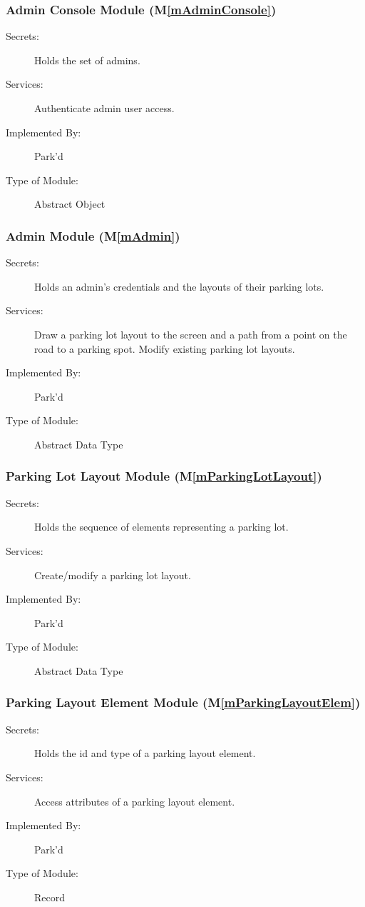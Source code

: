 \documentclass[12pt, titlepage]{article}
\newcommand{\mref}[1]{M\ref{#1}}
\begin{document}
\color{black}

\subsubsection{Admin Console Module (\mref{mAdminConsole})}
\begin{description}
\item[Secrets:] Holds the set of admins.
\item[Services:] Authenticate admin user access.
\item[Implemented By:] Park'd
\item[Type of Module:] Abstract Object
\end{description}

\subsubsection{Admin Module (\mref{mAdmin})}
\begin{description}
\item[Secrets:] Holds an admin's credentials and the layouts of their parking
lots.
\item[Services:] Draw a parking lot layout to the screen and a path from a point
on the road to a parking spot. Modify existing parking lot layouts.
\item[Implemented By:] Park'd
\item[Type of Module:] Abstract Data Type
\end{description}

\subsubsection{Parking Lot Layout Module (\mref{mParkingLotLayout})}
\begin{description}
\item[Secrets:] Holds the sequence of elements representing a parking lot.
\item[Services:] Create/modify a parking lot layout.
\item[Implemented By:] Park'd
\item[Type of Module:] Abstract Data Type
\end{description}

\subsubsection{Parking Layout Element Module (\mref{mParkingLayoutElem})}
\begin{description}
\item[Secrets:] Holds the id and type of a parking layout element.
\item[Services:] Access attributes of a parking layout element.
\item[Implemented By:] Park'd
\item[Type of Module:] Record
\end{description}
\end{document}
